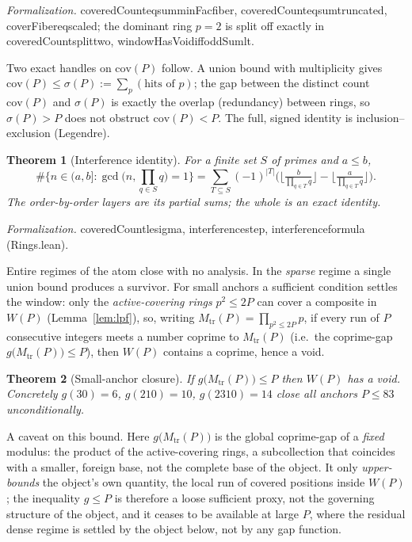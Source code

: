 \documentclass[11pt,a4paper]{amsart}
\theoremstyle{plain}
\newtheorem{theorem}{Theorem}[section]
\theoremstyle{definition}
\theoremstyle{plain}
\theoremstyle{remark}
\newcommand{\lean}[1]{\begingroup\upshape\ttfamily\def\_{\textunderscore\allowbreak}#1\endgroup}
\newcommand{\Formal}[1]{\par\smallskip\noindent\begingroup\raggedright\emph{Formalization.} #1\par\endgroup\smallskip}
\begin{document}
\Formal{\lean{coveredCount\_eq\_sum\_minFac\_fiber},
\lean{coveredCount\_eq\_sum\_truncated}, \lean{coverFiber\_eq\_scaled};
the dominant ring $p=2$ is split off exactly in \lean{coveredCount\_split\_two},
\lean{windowHasVoid\_iff\_oddSum\_lt}.}

Two exact handles on $\mathrm{cov}(P)$ follow. A union bound with multiplicity gives
$\mathrm{cov}(P)\le\sigma(P):=\sum_{p}(\text{hits of }p)$; the gap between the distinct
count $\mathrm{cov}(P)$ and $\sigma(P)$ is exactly the overlap (redundancy) between rings,
so $\sigma(P)>P$ does not obstruct $\mathrm{cov}(P)<P$. The full, signed identity is
inclusion--exclusion (Legendre).

\begin{theorem}[Interference identity]\label{thm:legendre}
For a finite set $S$ of primes and $a\le b$,
\[
\#\Big\{n\in(a,b]:\gcd\big(n,\textstyle\prod_{q\in S}q\big)=1\Big\}
=\sum_{T\subseteq S}(-1)^{|T|}
\Big(\big\lfloor\tfrac{b}{\prod_{q\in T}q}\big\rfloor
-\big\lfloor\tfrac{a}{\prod_{q\in T}q}\big\rfloor\Big).
\]
The order-by-order layers are its partial sums; the whole is an exact identity.
\end{theorem}

\Formal{\lean{coveredCount\_le\_sigma}, \lean{interference\_step},
\lean{interference\_formula} (\lean{Rings.lean}).}

Entire regimes of the atom close with no analysis. In the \emph{sparse} regime a single
union bound produces a survivor. For small anchors a sufficient condition settles the
window: only the \emph{active-covering rings} $p^2\le 2P$ can cover a composite in $W(P)$
(Lemma~\ref{lem:lpf}), so, writing $M_{\mathrm{tr}}(P)=\prod_{p^2\le 2P}p$, if every run of
$P$ consecutive integers meets a number coprime to $M_{\mathrm{tr}}(P)$ (i.e.\ the
coprime-gap $g\big(M_{\mathrm{tr}}(P)\big)\le P$), then $W(P)$ contains a coprime, hence a
void.

\begin{theorem}[Small-anchor closure]\label{thm:jac}
If $g\big(M_{\mathrm{tr}}(P)\big)\le P$ then $W(P)$ has a void. Concretely $g(30)=6$,
$g(210)=10$, $g(2310)=14$ close all anchors $P\le 83$ unconditionally.
\end{theorem}

A caveat on this bound. Here $g\big(M_{\mathrm{tr}}(P)\big)$ is the global coprime-gap of a
\emph{fixed} modulus: the product of the active-covering rings, a subcollection that
coincides with a smaller, foreign base, not the complete base of the object. It only
\emph{upper-bounds} the object's own quantity, the local run of covered positions inside
$W(P)$; the inequality $g\le P$ is therefore a loose sufficient proxy, not the governing
structure of the object, and it ceases to be available at large $P$, where the residual
dense regime is settled by the object below, not by any gap function.
\end{document}
